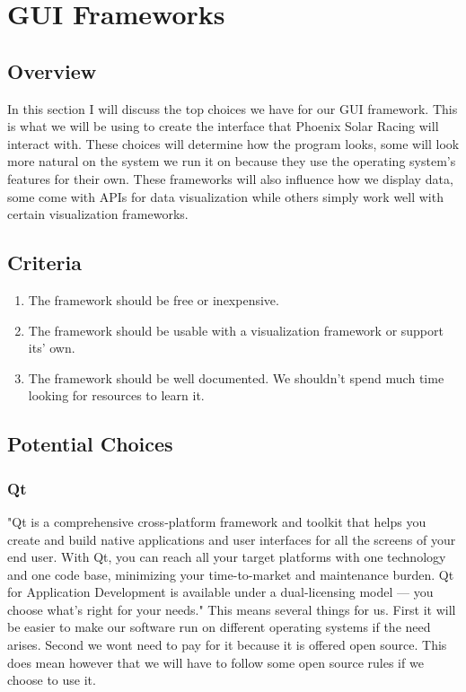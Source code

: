 \documentclass[onecolumn, draftclsnofoot,10pt, compsoc]{IEEEtran}
\begin{document}
\section{GUI Frameworks}

\subsection{Overview}
In this section I will discuss the top choices we have for our GUI framework. 
This is what we will be using to create the interface that Phoenix Solar Racing will interact with. 
These choices will determine how the program looks, some will look more natural on the system we run it on because they use the operating system's features for their own. 
These frameworks will also influence how we display data, some come with APIs for data visualization while others simply work well with certain visualization frameworks. 

\subsection{Criteria}
\begin{enumerate}
    \item The framework should be free or inexpensive.
    \item The framework should be usable with a visualization framework or support its' own.
    \item The framework should be well documented. We shouldn't spend much time looking for resources to learn it.
\end{enumerate}

\subsection{Potential Choices}

\subsubsection{Qt}
"Qt is a comprehensive cross-platform framework and toolkit that helps you create and build native applications and user interfaces for all the screens of your end user. With Qt, you can reach all your target platforms with one technology and one code base, minimizing your time-to-market and maintenance burden. Qt for Application Development is available under a dual-licensing model — you choose what’s right for your needs." \cite{qt} 
This means several things for us. 
First it will be easier to make our software run on different operating systems if the need arises.
Second we wont need to pay for it because it is offered open source. 
This does mean however that we will have to follow some open source rules if we choose to use it. 
\end{document}
